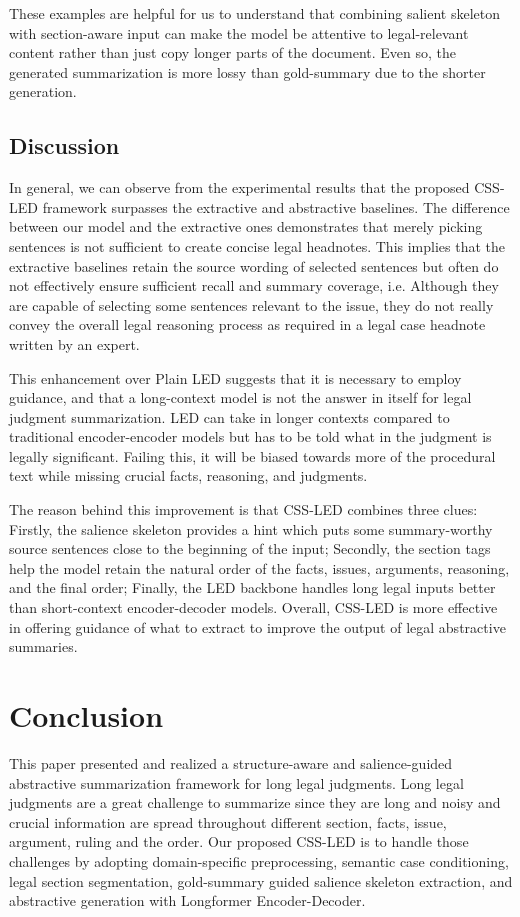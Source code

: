 \documentclass[11pt, a4paper]{article}
\theoremstyle{plain}%
\theoremstyle{remark}%
\theoremstyle{definition}%
\begin{document}
These examples are helpful for us to understand that combining salient skeleton with section-aware input can make the model be attentive to legal-relevant content rather than just copy longer parts of the document. Even so, the generated summarization is more lossy than gold-summary due to the shorter generation.

\subsection{Discussion}
In general, we can observe from the experimental results that the proposed CSS-LED framework surpasses the extractive and abstractive baselines. The difference between our model and the extractive ones demonstrates that merely picking sentences is not sufficient to create concise legal headnotes. This implies that the extractive baselines retain the source wording of selected sentences but often do not effectively ensure sufficient recall and summary coverage, i.e. Although they are capable of selecting some sentences relevant to the issue, they do not really convey the overall legal reasoning process as required in a legal case headnote written by an expert.

This enhancement over Plain LED suggests that it is necessary to employ guidance, and that a long-context model is not the answer in itself for legal judgment summarization. LED can take in longer contexts compared to traditional encoder-encoder models but has to be told what in the judgment is legally significant. Failing this, it will be biased towards more of the procedural text while missing crucial facts, reasoning, and judgments.

The reason behind this improvement is that CSS-LED combines three clues: Firstly, the salience skeleton provides a hint which puts some summary-worthy source sentences close to the beginning of the input; Secondly, the section tags help the model retain the natural order of the facts, issues, arguments, reasoning, and the final order; Finally, the LED backbone handles long legal inputs better than short-context encoder-decoder models. Overall, CSS-LED is more effective in offering guidance of what to extract to improve the output of legal abstractive summaries.

\section{Conclusion}

This paper presented and realized a structure-aware and salience-guided abstractive summarization framework for long legal judgments. Long legal judgments are a great challenge to summarize since they are long and noisy and crucial information are spread throughout different section, facts, issue, argument, ruling and the order. Our proposed CSS-LED is to handle those challenges by adopting domain-specific preprocessing, semantic case conditioning, legal section segmentation, gold-summary guided salience skeleton extraction, and abstractive generation with Longformer Encoder-Decoder.
\end{document}
